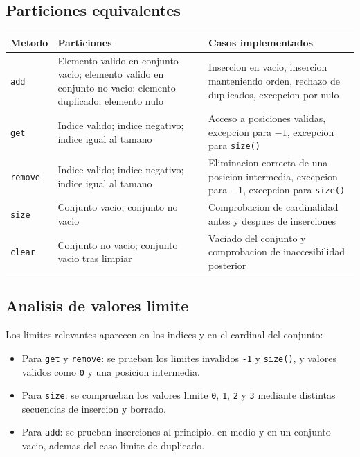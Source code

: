 \documentclass[11pt,a4paper]{article}
\begin{document}
\subsection{Particiones equivalentes}
\begin{longtable}{p{2.8cm}p{5.2cm}p{6cm}}
\toprule
Metodo & Particiones & Casos implementados \\
\midrule
\endhead
\texttt{add} &
Elemento valido en conjunto vacio; elemento valido en conjunto no vacio; elemento duplicado; elemento nulo &
Insercion en vacio, insercion manteniendo orden, rechazo de duplicados, excepcion por nulo \\
\texttt{get} &
Indice valido; indice negativo; indice igual al tamano &
Acceso a posiciones validas, excepcion para $-1$, excepcion para \texttt{size()} \\
\texttt{remove} &
Indice valido; indice negativo; indice igual al tamano &
Eliminacion correcta de una posicion intermedia, excepcion para $-1$, excepcion para \texttt{size()} \\
\texttt{size} &
Conjunto vacio; conjunto no vacio &
Comprobacion de cardinalidad antes y despues de inserciones \\
\texttt{clear} &
Conjunto no vacio; conjunto vacio tras limpiar &
Vaciado del conjunto y comprobacion de inaccesibilidad posterior \\
\bottomrule
\end{longtable}

\subsection{Analisis de valores limite}
Los limites relevantes aparecen en los indices y en el cardinal del conjunto:
\begin{itemize}
\item Para \texttt{get} y \texttt{remove}: se prueban los limites invalidos \texttt{-1} y \texttt{size()}, y valores validos como \texttt{0} y una posicion intermedia.
\item Para \texttt{size}: se comprueban los valores limite \texttt{0}, \texttt{1}, \texttt{2} y \texttt{3} mediante distintas secuencias de insercion y borrado.
\item Para \texttt{add}: se prueban inserciones al principio, en medio y en un conjunto vacio, ademas del caso limite de duplicado.
\end{itemize}
\end{document}
